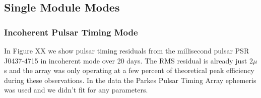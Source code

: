 \subsection{Single Module Modes}
\subsubsection{Incoherent Pulsar Timing Mode}

In Figure XX we show pulsar timing residuals from the millisecond pulsar PSR J0437-4715 in incoherent mode over 20 days. The RMS residual is already just 2$\mu$s and the array was only operating at a few percent of theoretical peak efficiency during these observations. In the data the Parkes Pulsar Timing Array ephemeris was used and we didn't fit for any parameters.


